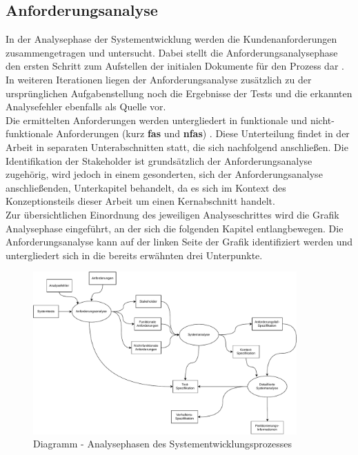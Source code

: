 \documentclass[../../../Bachelorarbeit.tex]{subfiles}
\begin{document}
\subsection{Anforderungsanalyse} \label{anforderungsana}
In der Analysephase der Systementwicklung werden die Kundenanforderungen zusammengetragen und untersucht.
Dabei stellt die Anforderungsanalysephase den ersten Schritt zum Aufstellen der initialen Dokumente für den Prozess dar \cite[333]{Lauber1999}. In weiteren Iterationen liegen der Anforderungsanalyse zusätzlich zu der ursprünglichen Aufgabenstellung noch die Ergebnisse der Tests und die erkannten Analysefehler ebenfalls als Quelle vor.\\
Die ermittelten Anforderungen werden untergliedert in funktionale und nicht-funktionale Anforderungen (kurz \textbf{\acsp{fa}} und \textbf{\acsp{nfa}}) \cite[337]{Lauber1999}. Diese Unterteilung findet in der Arbeit in separaten Unterabschnitten statt, die sich nachfolgend anschließen. Die Identifikation der Stakeholder ist grundsätzlich der Anforderungsanalyse zugehörig, wird jedoch in einem gesonderten, sich der Anforderungsanalyse anschließenden, Unterkapitel behandelt, da es sich im Kontext des Konzeptionsteils dieser Arbeit um einen Kernabschnitt handelt.\\
Zur übersichtlichen Einordnung des jeweiligen Analyseschrittes wird die Grafik Analysephase eingeführt, an der sich die folgenden Kapitel entlangbewegen. Die Anforderungsanalyse kann auf der linken Seite der Grafik identifiziert werden und untergliedert sich in die bereits erwähnten drei Unterpunkte.\\

\begin{figure}[H]
    \centering
    \includegraphics[width=0.9\textwidth]{Images/AnalyseDiagramm.vpd.pdf}
    \caption[Analysephasen]{Diagramm - Analysephasen des Systementwicklungsprozesses \cite[42]{Walke2005}}
    \label{fig:my-img8}
\end{figure}
\end{document}
